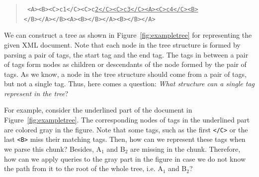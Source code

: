 \begin{quote}\small\tt
	<A><B><C>c1</C><C>c\underline{2</C><C>c3</C><A><C>c4</C><B>}\\
	</B></A></B><A><B></B></A><B></B></A> \end{quote}

We can construct a tree as shown in Figure~\ref{fig:exampletree} for
representing the given XML document. Note that each node in the tree structure
is formed by parsing a pair of tags, the start tag and the end tag. The tags in
between a pair of tags form nodes as children or descendants of the node formed
by the pair of tags. As we know, a node in the tree structure should come from a
pair of tags, but not a single tag. Thus, here comes a question: \emph{What
	structure can a single tag represent in the tree\/}?

For example, consider the underlined part of the document in
Figure~\ref{fig:exampletree}. The corresponding nodes of tags in the underlined
part are colored gray in the figure. Note that some tags, such as the first
\verb|</C>| or the last \verb|<B>| miss their matching tags. Then, how can we
represent these tags when we parse this chunk?  Besides, A$_1$ and B$_2$ are
missing in the chunk. Therefore, how can we apply  queries to the gray part in
the figure in case we do not know the path  from it to the root of the whole
tree, i.e.  A$_1$ and B$_2$?

